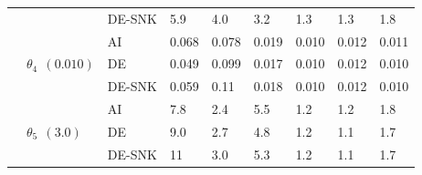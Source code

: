 \begin{table}[ht]
\begin{tabularx}{\textwidth}{lllXXXXXX}
& & DE-SNK & 5.9 \cellcolor[HTML]{50A700} & 4.0 \cellcolor[HTML]{008000} & 3.2 \cellcolor[HTML]{2A9400} & 1.3 \cellcolor[HTML]{F2F800} & 1.3 \cellcolor[HTML]{ECF500} & 1.8 \cellcolor[HTML]{ACD500} \\
\cmidrule(lr){4-6} \cmidrule(lr){7-9}
& \multirow{3}{*}{$\theta_4 \:\: (0.010)$} & AI & 0.068 \cellcolor[HTML]{FF6900} & 0.078 \cellcolor[HTML]{FF4E00} & 0.019 \cellcolor[HTML]{82C000} & 0.010 \cellcolor[HTML]{028000} & 0.012 \cellcolor[HTML]{229000} & 0.011 \cellcolor[HTML]{0C8500} \\
& & DE & 0.049 \cellcolor[HTML]{FFB200} & 0.099 \cellcolor[HTML]{FF1C00} & 0.017 \cellcolor[HTML]{74B900} & 0.010 \cellcolor[HTML]{048100} & 0.012 \cellcolor[HTML]{249100} & 0.010 \cellcolor[HTML]{028000} \\
& & DE-SNK & 0.059 \cellcolor[HTML]{FF8A00} & 0.11 \cellcolor[HTML]{FF0000} & 0.018 \cellcolor[HTML]{79BC00} & 0.010 \cellcolor[HTML]{068200} & 0.012 \cellcolor[HTML]{1E8E00} & 0.010 \cellcolor[HTML]{008000} \\
\cmidrule(lr){4-6} \cmidrule(lr){7-9}
& \multirow{3}{*}{$\theta_5 \:\: (3.0)$} & AI & 7.8 \cellcolor[HTML]{CAE400} & 2.4 \cellcolor[HTML]{2C9500} & 5.5 \cellcolor[HTML]{7EBE00} & 1.2 \cellcolor[HTML]{BADC00} & 1.2 \cellcolor[HTML]{C8E300} & 1.8 \cellcolor[HTML]{6CB500} \\
& & DE & 9.0 \cellcolor[HTML]{E8F300} & 2.7 \cellcolor[HTML]{128800} & 4.8 \cellcolor[HTML]{64B100} & 1.2 \cellcolor[HTML]{BCDD00} & 1.1 \cellcolor[HTML]{CAE400} & 1.7 \cellcolor[HTML]{74B900} \\
& & DE-SNK & 11 \cellcolor[HTML]{FFEE00} & 3.0 \cellcolor[HTML]{028000} & 5.3 \cellcolor[HTML]{74B900} & 1.2 \cellcolor[HTML]{BCDD00} & 1.1 \cellcolor[HTML]{D0E700} & 1.7 \cellcolor[HTML]{74B900} \\
\bottomrule
\end{tabularx}
\end{table}

